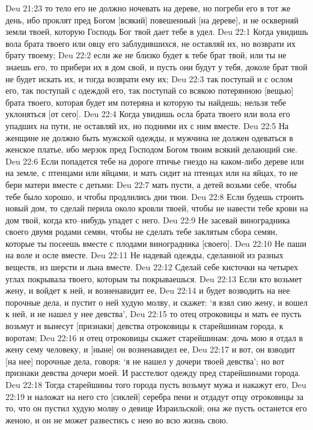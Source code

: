 Deu 21:23  то тело его не должно ночевать на дереве, но погреби его в тот же день, ибо проклят пред Богом [всякий] повешенный [на дереве], и не оскверняй земли твоей, которую Господь Бог твой дает тебе в удел.
Deu 22:1  Когда увидишь вола брата твоего или овцу его заблудившихся, не оставляй их, но возврати их брату твоему;
Deu 22:2  если же не близко будет к тебе брат твой, или ты не знаешь его, то прибери их в дом свой, и пусть они будут у тебя, доколе брат твой не будет искать их, и тогда возврати ему их;
Deu 22:3  так поступай и с ослом его, так поступай с одеждой его, так поступай со всякою потерянною [вещью] брата твоего, которая будет им потеряна и которую ты найдешь; нельзя тебе уклоняться [от сего].
Deu 22:4  Когда увидишь осла брата твоего или вола его упадших на пути, не оставляй их, но подними их с ним вместе.
Deu 22:5  На женщине не должно быть мужской одежды, и мужчина не должен одеваться в женское платье, ибо мерзок пред Господом Богом твоим всякий делающий сие.
Deu 22:6  Если попадется тебе на дороге птичье гнездо на каком-либо дереве или на земле, с птенцами или яйцами, и мать сидит на птенцах или на яйцах, то не бери матери вместе с детьми:
Deu 22:7  мать пусти, а детей возьми себе, чтобы тебе было хорошо, и чтобы продлились дни твои.
Deu 22:8  Если будешь строить новый дом, то сделай перила около кровли твоей, чтобы не навести тебе крови на дом твой, когда кто--нибудь упадет с него.
Deu 22:9  Не засевай виноградника своего двумя родами семян, чтобы не сделать тебе заклятым сбора семян, которые ты посеешь вместе с плодами виноградника [своего].
Deu 22:10  Не паши на воле и осле вместе.
Deu 22:11  Не надевай одежды, сделанной из разных веществ, из шерсти и льна вместе.
Deu 22:12  Сделай себе кисточки на четырех углах покрывала твоего, которым ты покрываешься.
Deu 22:13  Если кто возьмет жену, и войдет к ней, и возненавидит ее,
Deu 22:14  и будет возводить на нее порочные дела, и пустит о ней худую молву, и скажет: `я взял сию жену, и вошел к ней, и не нашел у нее девства',
Deu 22:15  то отец отроковицы и мать ее пусть возьмут и вынесут [признаки] девства отроковицы к старейшинам города, к воротам;
Deu 22:16  и отец отроковицы скажет старейшинам: дочь мою я отдал в жену сему человеку, и [ныне] он возненавидел ее,
Deu 22:17  и вот, он взводит [на нее] порочные дела, говоря: `я не нашел у дочери твоей девства'; но вот признаки девства дочери моей. И расстелют одежду пред старейшинами города.
Deu 22:18  Тогда старейшины того города пусть возьмут мужа и накажут его,
Deu 22:19  и наложат на него сто [сиклей] серебра пени и отдадут отцу отроковицы за то, что он пустил худую молву о девице Израильской; она же пусть останется его женою, и он не может развестись с нею во всю жизнь свою.
